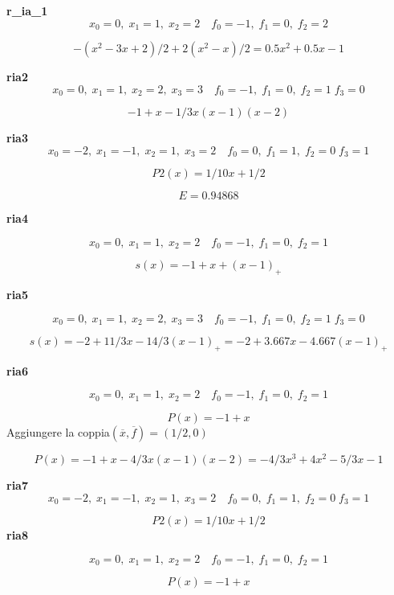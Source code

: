 

\def\N{\hbox{I\kern-.2em\hbox{N}}}
\def\P{\hbox{I\kern-.2em\hbox{P}}}
\def\R{\hbox{\rm I\kern-.2em\hbox{\rm R}}}
\def\Z{\hbox{\rm Z\kern-4.0pt{\rm Z}}}


{\bf r\_ia\_1}
$$ x_0=0, \; x_1=1, \; x_2=2 \quad f_0=-1, \; f_1=0, \; f_2=2 $$



$$-(x^2-3x+2)/2+2(x^2-x)/2=0.5x^2+0.5x-1$$


{\bf ria2}
$$ x_0=0, \; x_1=1, \; x_2=2, \; x_3=3 \quad f_0=-1, \; f_1=0, \; f_2=1 \; f_3=0 $$


$$-1+x-1/3 x(x-1)(x-2)$$



{\bf ria3}
$$ x_0=-2, \; x_1=-1, \; x_2=1, \; x_3=2 \quad f_0=0, \; f_1=1, \; f_2=0 \; f_3=1 $$

$$P2(x)=1/10 x+1/2$$

$$ E=0.94868$$


{\bf ria4}

$$ x_0=0, \; x_1=1, \; x_2=2 \quad f_0=-1, \; f_1=0, \; f_2=1 $$


$$s(x)=-1+x+(x-1)_+$$



{\bf ria5}

$$ x_0=0, \; x_1=1, \; x_2=2, \; x_3=3 \quad f_0=-1, \; f_1=0, \; f_2=1 \; f_3=0 $$

$$s(x)=-2+11/3x-14/3(x-1)_+= -2+3.667x-4.667(x-1)_+$$


{\bf ria6}

$$ x_0=0, \; x_1=1, \; x_2=2 \quad f_0=-1, \; f_1=0, \; f_2=1 $$

$$P(x)=-1+x$$
Aggiungere la coppia$(\overline{x},\overline{f})=(1/2,0)$

$$ P(x)=-1+x-4/3x(x-1)(x-2)=-4/3x^3+4x^2-5/3x-1$$

{\bf ria7}
$$ x_0=-2, \; x_1=-1, \; x_2=1, \; x_3=2 \quad f_0=0, \; f_1=1, \; f_2=0 \; f_3=1 $$

$$P2(x)=1/10 x+1/2$$
{\bf ria8}

$$ x_0=0, \; x_1=1, \; x_2=2 \quad f_0=-1, \; f_1=0, \; f_2=1 $$

$$P(x)=-1+x$$


